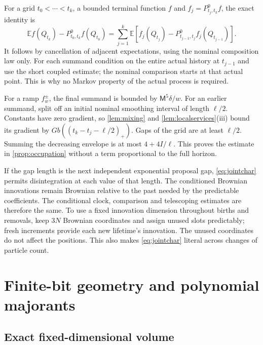 \documentclass[11pt]{article}
\numberwithin{equation}{section}
\theoremstyle{definition}
\theoremstyle{remark}\newtheorem{remark}[theorem]{Remark}
\newcommand{\E}{\mathbb E}
\begin{document}
For a grid $t_0<\cdots<t_k$, a bounded terminal function $f$ and
$f_j=P^0_{t_j,t_k}f$, the exact identity is
\begin{equation}\label{eq:telescopeexact}
 \E f(Q_{t_k})-P^0_{t_0,t_k}f(Q_{t_0})
 =\sum_{j=1}^k\E\left[
 f_j(Q_{t_j})-P^0_{t_{j-1},t_j}f_j(Q_{t_{j-1}})\right].
\end{equation}
It follows by cancellation of adjacent expectations, using the nominal
composition law only. For each summand condition on the entire actual
history at $t_{j-1}$ and use the short coupled estimate; the nominal
comparison starts at that actual point. This is why no Markov property of
the actual process is required.

For a ramp $f_w^\pm$, the final summand is bounded by
$\mathsf M^5\delta/w$. For an earlier summand, split off an initial
nominal smoothing interval of length $\ell/2$. Constants have zero
gradient, so \cref{lem:mixing} and \cref{lem:localservices}(iii) bound its
gradient by $G b((t_k-t_j-\ell/2)_+)$. Gaps of the grid are at least
$\ell/2$. Summing the decreasing envelope is at most $4+4I/\ell$.
This proves the estimate in \cref{prop:occupation} without a term
proportional to the full horizon.

If the gap length is the next independent exponential proposal gap,
\eqref{eq:jointchar} permits disintegration at each value of that length.
The conditioned Brownian innovations remain Brownian relative to the past
needed by the predictable coefficients. The conditional clock, comparison
and telescoping estimates are therefore the same. To use a fixed
innovation dimension throughout births and removals, keep $3N$ Brownian
coordinates and assign unused slots predictably; fresh increments provide
each new lifetime's innovation. The unused coordinates do not affect the
positions. This also makes \eqref{eq:jointchar} literal across changes of
particle count.



\section{Finite-bit geometry and polynomial majorants}
\label{app:arithmetic}

\subsection{Exact fixed-dimensional volume}
\end{document}
